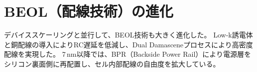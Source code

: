 \section{BEOL（配線技術）の進化}
デバイススケーリングと並行して、BEOL技術も大きく進化した。  
Low-k誘電体と銅配線の導入によりRC遅延を低減し、Dual Damasceneプロセスにより高密度配線を実現した。  
7\,nm以降では、BPR（Backside Power Rail）により電源層をシリコン裏面側に再配置し、セル内部配線の自由度を拡大している。
